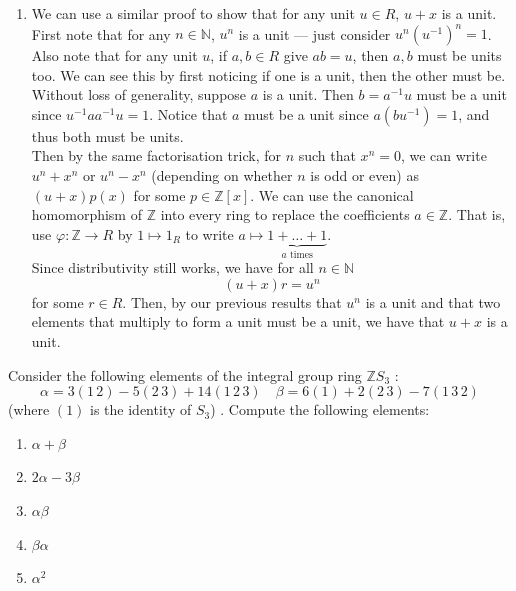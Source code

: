 \documentclass[12 pt, letterpaper]{hmcpset}
\begin{document}
\begin{solution}
\begin{enumerate}
\[\begin{split}
										      & = 1 - 0 \\
										      & = 1
				\end{split}
			\]
			for $n$ even and
			\[
				\begin{split}
					(1 + x)(x^{n - 1} - x^{n - 2} + \dots + x^{2} - x + 1) & = 1 + x^{n} \\
											       & = 1 + 0 \\
											       & = 1
				\end{split}
			\]
			for $n$ odd. Thus, we have that $1 + x$ is a unit in both cases.
		\item We can use a similar proof to show that for any unit $u \in R$, $u + x$ is a unit. \\
			
			First note that for any $n \in \mathbb{N}$, $u^{n}$ is a unit --- just consider $u^{n} (u^{-1})^{n} = 1$. Also note that for any unit $u$, if $a, b \in R$ give $ab = u$, then $a, b$ must be units too. We can see this by first noticing if one is a unit, then the other must be. Without loss of generality, suppose $a$ is a unit. Then $b = a^{-1} u$ must be a unit since $u^{-1} a a^{-1} u = 1$. Notice that $a$ must be a unit since $a (b u^{-1}) = 1$, and thus both must be units. \\
			
			Then by the same factorisation trick, for $n$ such that $x^{n} = 0$, we can write $u^{n} + x^{n}$ or $u^{n} - x^{n}$ (depending on whether $n$ is odd or even) as $(u + x) p(x)$ for some $p \in \mathbb{Z}[x]$. We can use the canonical homomorphism of $\mathbb{Z}$ into every ring to replace the coefficients $a \in \mathbb{Z}$. That is, use $\varphi : \mathbb{Z} \to R$ by $1 \mapsto 1_{R}$ to write $a \mapsto \underbrace{1 + \dots + 1}_{a \text{ times}}$. \\
			
			Since distributivity still works, we have for all $n \in \mathbb{N}$
			\[
				(u + x) r = u^{n}
			\]
			for some $r \in R$. Then, by our previous results that $u^{n}$ is a unit and that two elements that multiply to form a unit must be a unit, we have that $u + x$ is a unit.
	\end{enumerate}
\end{solution}

\pagebreak

\begin{problem}
	Consider the following elements of the integral group ring $\mathbb{Z} S_{3}$ :
	\[
		\alpha = 3 (1 \, 2) - 5 (2 \, 3) + 14 (1 \, 2 \, 3) \quad \beta = 6 (1) + 2 (2 \, 3) - 7 (1 \, 3 \, 2)
	\]
	(where $(1)$ is the identity of $S_{3}$) . Compute the following elements:
	\begin{enumerate}
		\item $\alpha + \beta$
		\item $2 \alpha - 3 \beta$
		\item $\alpha \beta$
		\item $\beta \alpha$
		\item $\alpha^{2}$
	\end{enumerate}
\end{problem}
\end{document}
